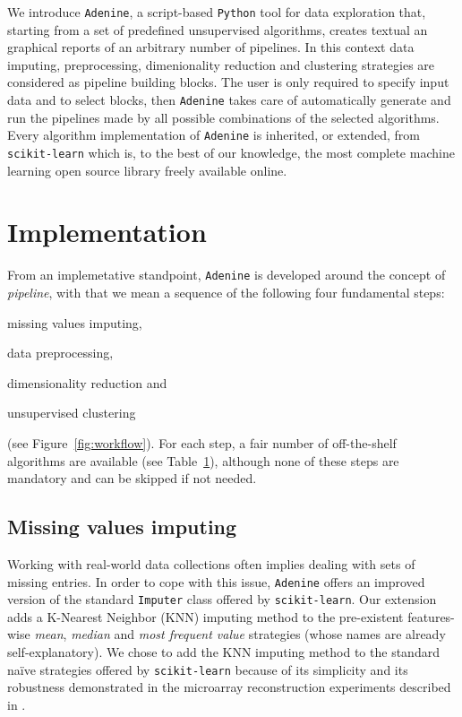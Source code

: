 \documentclass[twoside,11pt]{article}
\makeatletter
\newcommand{\ade}{\texttt{Adenine}\@\xspace}
\newcommand{\py}{\texttt{Python}\@\xspace}
\makeatother
\begin{document}
We introduce \ade, a script-based \py tool for data exploration that, starting from a set of predefined unsupervised algorithms, creates textual an graphical reports of an arbitrary number of pipelines. In this context data imputing, preprocessing, dimenionality reduction and clustering strategies are considered as pipeline building blocks. The user is only required to specify input data and to select blocks, then \ade takes care of automatically generate and run the pipelines made by all possible combinations of the selected algorithms. Every algorithm implementation of \ade is inherited, or extended, from \texttt{scikit-learn} \citep{scikit-learn} which is, to the best of our knowledge, the most complete machine learning open source library freely available online.


\section{Implementation}\label{sec:implem}
From an implemetative standpoint, \ade is developed around the concept of \emph{pipeline}, with that we mean a sequence of the following four fundamental steps:
\begin{enumerate*}[label=(\roman*)]
  \item missing values imputing,
  \item data preprocessing,
  \item dimensionality reduction and
  \item unsupervised clustering
\end{enumerate*} (see Figure~\ref{fig:workflow}).
For each step, a fair number of off-the-shelf algorithms are available (see Table~\ref{sec:implem}), although none of these steps are mandatory and can be skipped if not needed.

\subsection*{Missing values imputing}
Working with real-world data collections often implies dealing with sets of missing entries. In order to cope with this issue, \ade offers an improved version of the standard \texttt{Imputer} class offered by \texttt{scikit-learn}. Our extension adds a K-Nearest Neighbor (KNN) imputing method to the pre-existent features-wise \emph{mean}, \emph{median} and \emph{most frequent value} strategies (whose names are already self-explanatory). We chose to add the KNN imputing method to the standard na\"ive strategies offered by \texttt{scikit-learn} because of its simplicity and its robustness demonstrated in the microarray reconstruction experiments described in \citep{troyanskaya2001missing}.
\end{document}
